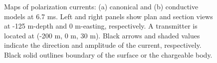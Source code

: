 \documentclass[extra,mreferee]{gji}
\begin{document}
\begin{figure}
  \caption{Maps of polarization currents: (a) canonical and (b) conductive models at 6.7 ms. Left and right panels show plan and section views at -125 m-depth and 0 m-easting, respectively. A transmitter is located at (-200 m, 0 m, 30 m). Black arrows and shaded values indicate the direction and amplitude of the current, respectively. Black solid outlines boundary of the surface or the chargeable body.}
  \label{F:Polarizationcurrent_late}
\end{figure}
\end{document}
